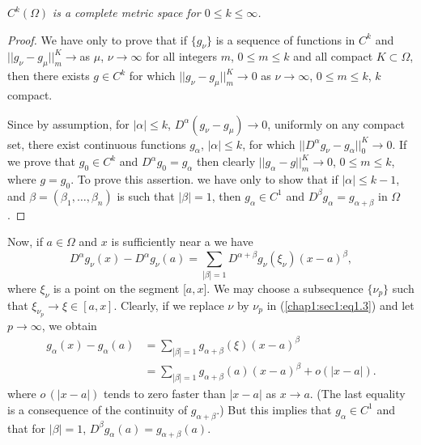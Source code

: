 \begin{theorem}\label{chap1:sec1:thm2}%
  $C^k (\Omega)$ \em{is a complete metric space for $0 \leq k \leq \infty$.}
\end{theorem}

\begin{proof}
  We have only to prove that if $\{ g_{\nu} \}$ is a sequence of
  functions in $C^k$ and  
  $|| g_{\nu} - g_{\mu}||^K_m \to $\pageoriginale as $\mu$, $\nu \to \infty$  for all
  integers $m$, 
  $0 \leq m \leq k$ and all compact $K \subset \Omega$, then there
  exists $g \in C^k$ for which  
  $|| g_{\nu} - g_{\mu}||^K_m \to 0$  as   $\nu \to \infty$, $0 \leq m
  \leq k$, $k$ compact. 
  
  Since by assumption, for $|\alpha| \leq k$, $D^{\alpha} (g_{\nu} -
  g_{\mu}) \to 0$, uniformly on any compact set, there exist continuous
  functions $g_{\alpha}$, $| \alpha | \leq k$, for which $|| D^{\alpha}
  g_{\nu} - g_{\alpha}||^K_0 \to 0$. If we prove that $g_0 \in C^k$ and
  $D^{\alpha} g_0 = g_{\alpha}$ then clearly $|| g_{\alpha} - g ||^K_m
  \to 0$, $0 \leq m \leq k$, where $g= g_0$. To prove this assertion. we
  have only to show that if $| \alpha | \leq k-1$, and $\beta =
  (\beta_1, \ldots , \beta_n)$ is such that $| \beta | =1$, then
  $g_{\alpha} \in C^1$ and $D^{\beta} g_{\alpha} = g_{\alpha + \beta}$
  in $\Omega$. 
\end{proof}

Now, if $a \in \Omega$ and $x$ is sufficiently near a we have 
\begin{equation}
  D^{\alpha} g_{\nu} (x) - D^{\alpha} g_{\nu} (a) = \sum_{|\beta| =1}
  D^{\alpha + \beta} g_{\nu} (\xi_{\nu}) (x-a)^{\beta},
  \tag{1.3}\label{chap1:sec1:eq1.3} 
\end{equation}
where $\xi_{\nu}$ is a point on the segment [$a, x$]. We may choose a
subsequence $\{ \nu_p \}$ such that $\xi_{\nu_{p}} \to \xi \in [a,
  x]$. Clearly, if we replace $\nu$ by $\nu_p$ in (\ref{chap1:sec1:eq1.3}) and let $p
\to \infty$, we obtain 
\begin{align*}
  g_{\alpha} (x) - g_{\alpha} (a) & = \sum_{|\beta| =1} g_{\alpha +
    \beta} (\xi) (x-a)^{\beta}\\ 
  & = \sum_{|\beta| =1} g_{\alpha + \beta} (a) (x-a)^{\beta} + o(|x-a|).
\end{align*}
where $o\, (| x - a|)$ tends to zero faster than $| x -a |$ as $x
\to a$. (The last equality is a consequence of the continuity of
$g_{\alpha + \beta}.$) But this implies that $g_{\alpha} \in C^1$ and
that for $| \beta | = 1$, $D^{\beta} g_{\alpha} (a) = g_{\alpha +
  \beta }(a)$. 

